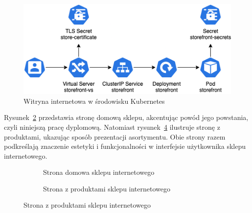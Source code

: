 \begin{figure}[H]
    \centering
    \includegraphics[width=\textwidth]{img/kubernetes-storefront}
    \caption{Witryna internetowa w środowisku Kubernetes}
    \label{fig:kubernetes-storefront}
\end{figure}

Rysunek~\ref{fig:storefront-homepage} przedstawia stronę domową sklepu, akcentując powód jego powstania, czyli niniejszą pracę dyplomową.
Natomiast rysunek~\ref{fig:storefront-products} ilustruje stronę z produktami, ukazując sposób prezentacji asortymentu.
Obie strony razem podkreślają znaczenie estetyki i funkcjonalności w interfejsie użytkownika sklepu internetowego.

\begin{figure}[p]
    \begin{figure}[H]
        \centering
        \caption{Strona domowa sklepu internetowego}
        \label{fig:storefront-homepage}
    \end{figure}

    \begin{figure}[H]
        \centering
        \caption{Strona z produktami sklepu internetowego}
        \label{fig:storefront-products}
    \end{figure}
\end{figure}

